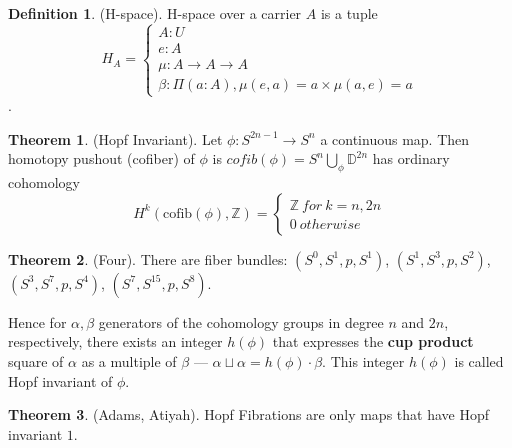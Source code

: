 \documentclass{article}
\theoremstyle{definition}
\newtheorem{definition}{Definition}
\newtheorem{theorem}{Theorem}
\begin{document}
\begin{definition} (H-space).
H-space over a carrier $A$ is a tuple
$$
H_A=
\begin{cases}
A : U\\
e : A\\
\mu : A \rightarrow A \rightarrow A\\
\beta : \Pi (a:A), \mu(e,a)=a \times \mu(a,e)=a
\end{cases}
$$.
\end{definition}

\newpage
\begin{theorem} (Hopf Invariant).
Let $\phi: S^{2n-1} \rightarrow S^{n}$ a continuous map.
Then homotopy pushout (cofiber) of $\phi$ is
$cofib(\phi) = S^{n} \bigcup_\phi \mathbb{D}^{2n}$ has
ordinary cohomology
$$
H^{k}(\text{cofib}(\phi),\mathbb{Z})=
\begin{cases}
\mathbb{Z}\ for\ k=n,2n \\[2ex]
0\ otherwise
\end{cases}
$$
\end{theorem}


\begin{theorem} (Four).
There are fiber bundles:
$(S^0,S^1,p,S^1)$,
$(S^1,S^3,p,S^2)$,
$(S^3,S^7,p,S^4)$,
$(S^7,S^{15},p,S^8)$.
\end{theorem}

Hence for $\alpha,\beta$ generators of the cohomology groups in
degree $n$ and $2n$, respectively, there exists an integer $h(\phi)$
that expresses the {\textbf{cup product}} square of $\alpha$
as a multiple of $\beta$ --- $\alpha\sqcup\alpha=h(\phi)\cdot\beta$.
This integer $h(\phi)$ is called Hopf invariant of $\phi$.

\begin{theorem} (Adams, Atiyah).
Hopf Fibrations are only maps that have Hopf invariant $1$.
\end{theorem}




\end{document}
